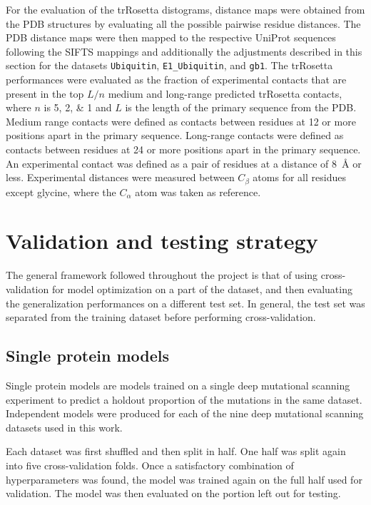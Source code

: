 For the evaluation of the trRosetta distograms, distance maps were obtained from the PDB structures by evaluating all the possible pairwise residue distances.
The PDB distance maps were then mapped to the respective UniProt sequences following the SIFTS mappings and additionally the adjustments described in this section for the datasets \texttt{Ubiquitin}, \texttt{E1\_Ubiquitin}, and \texttt{gb1}.
The trRosetta performances were evaluated as the fraction of experimental contacts that are present in the top $L/n$ medium and long-range predicted trRosetta contacts, where $n$ is \numlist{5;2;1} and $L$ is the length of the primary sequence from the PDB\@.
Medium range contacts were defined as contacts between residues at \num{12} or more positions apart in the primary sequence.
Long-range contacts were defined as contacts between residues at \num{24} or more positions apart in the primary sequence.
An experimental contact was defined as a pair of residues at a distance of \SI{8}{\angstrom} or less.
Experimental distances were measured between $C_\beta$ atoms for all residues except glycine, where the $C_\alpha$ atom was taken as reference.

\section{Validation and testing strategy}\label{sec:mm_validation_and_testing}
The general framework followed throughout the project is that of using cross-validation for model optimization on a part of the dataset, and then evaluating the generalization performances on a different test set.
In general, the test set was separated from the training dataset before performing cross-validation.

\subsection{Single protein models}\label{sec:mm_single_protein_models}
Single protein models are models trained on a single deep mutational scanning experiment to predict a holdout proportion of the mutations in the same dataset.
Independent models were produced for each of the nine deep mutational scanning datasets used in this work.

Each dataset was first shuffled and then split in half.
One half was split again into five cross-validation folds.
Once a satisfactory combination of hyperparameters was found, the model was trained again on the full half used for validation.
The model was then evaluated on the portion left out for testing.

